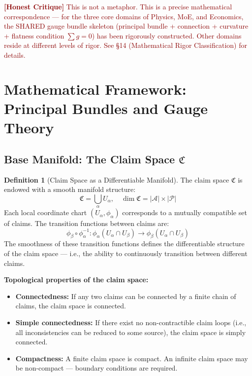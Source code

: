 \documentclass[12pt,a4paper]{article}
\theoremstyle{plain}
\theoremstyle{definition}
\newtheorem{definition}[theorem]{Definition}
\newcommand{\Acal}{\mathcal{A}}
\newcommand{\Pcal}{\mathcal{P}}
\newcommand{\ClaimSpace}{\mathfrak{C}}
\newcommand{\honestcrit}[1]{%
    \textcolor{darkred}{\textbf{[Honest Critique]} #1}%
}
\begin{document}
\honestcrit{This is not a metaphor. This is a precise mathematical correspondence — for the three core domains of Physics, MoE, and Economics, the SHARED gauge bundle skeleton (principal bundle + connection + curvature + flatness condition $\sum g = 0$) has been rigorously constructed. Other domains reside at different levels of rigor. See \S 14 (Mathematical Rigor Classification) for details.}

\newpage


\section{Mathematical Framework: Principal Bundles and Gauge Theory}

\subsection{Base Manifold: The Claim Space $\ClaimSpace$}

\begin{definition}[Claim Space as a Differentiable Manifold]
The claim space $\ClaimSpace$ is endowed with a smooth manifold structure:
\begin{equation}
    \ClaimSpace = \bigcup_{\alpha} U_\alpha, \quad \dim \ClaimSpace = |\Acal| \times |\Pcal|
\end{equation}
Each local coordinate chart $(U_\alpha, \phi_\alpha)$ corresponds to a mutually compatible set of claims.
The transition functions between claims are:
\begin{equation}
    \phi_\beta \circ \phi_\alpha^{-1}: \phi_\alpha(U_\alpha \cap U_\beta) \to \phi_\beta(U_\alpha \cap U_\beta)
\end{equation}
The smoothness of these transition functions defines the differentiable structure of the claim space — i.e., the ability to continuously transition between different claims.
\end{definition}

\textbf{Topological properties of the claim space:}
\begin{itemize}
    \item \textbf{Connectedness:} If any two claims can be connected by a finite chain of claims, the claim space is connected.
    \item \textbf{Simple connectedness:} If there exist no non-contractible claim loops (i.e., all inconsistencies can be reduced to some source), the claim space is simply connected.
    \item \textbf{Compactness:} A finite claim space is compact. An infinite claim space may be non-compact — boundary conditions are required.
\end{itemize}
\end{document}
